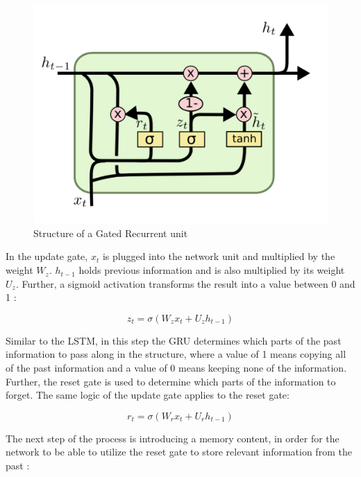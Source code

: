 \indent\newline 
\begin{figure}[H]
\centering
\includegraphics [scale=0.40,angle=360]{figures/gru.png}
\caption{Structure of a Gated Recurrent unit \cite{olah}}
\label{fig:gru}
\end{figure}

\indent\newline 
In the update gate, $x_{t}$ is plugged into the network unit and multiplied by the weight $W_{z}$. $h_{t-1}$ holds previous information and is also multiplied by its weight $U_{z}$. Further, a sigmoid activation transforms the result into a value between 0 and 1 \cite{kosta}:

\begin{equation}
z_{t} = \sigma(W_{z} x_{t} + U_{z} h_{t-1})
\end{equation}

\indent\newline 
Similar to the LSTM, in this step the GRU determines which parts of the past information to pass along in the structure, where a value of 1 means copying all of the past information and a value of 0 means keeping none of the information. Further, the reset gate is used to determine which parts of the information to forget. The same logic of the update gate applies to the reset gate:

\begin{equation}
r_{t} = \sigma(W_{r} x_{t} + U_{r} h_{t-1})
\end{equation}

\indent\newline 
The next step of the process is introducing a memory content, in order for the network to be able to utilize the reset gate to store relevant information from the past \cite{kosta}:


